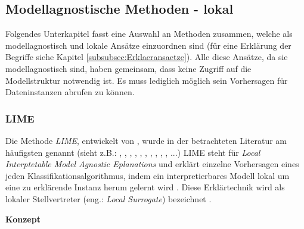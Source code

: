 \subsection{Modellagnostische Methoden - lokal}

Folgendes Unterkapitel fasst eine Auswahl an Methoden zusammen, welche als modellagnostisch und lokale Ansätze einzuordnen sind (für eine Erklärung der Begriffe siehe Kapitel \ref{subsubsec:Erklaeransaetze}). Alle diese Ansätze, da sie modellagnostisch sind, haben gemeinsam, dass keine Zugriff auf die Modellstruktur notwendig ist. Es muss lediglich möglich sein Vorhersagen für Dateninstanzen abrufen zu können.

\subsubsection{LIME}
\label{subsubse_LIME}
Die Methode \emph{LIME}, entwickelt von \textcite{ribeiro2016should}, wurde in der betrachteten Literatur am häufigsten genannt (sieht z.B.: \cite{weitz2019you}, \cite{goldenfein2019algorithmic}, \cite{tsiakmaki2021case}, \cite{tjoa2020survey}, \cite{hanif2021survey}, \cite{krause2017workflow}, \cite{gomez2021advice}, \cite{wang2020explainable}, \cite{strobel2019aspects}, \cite{westin2020building}, ...)
LIME steht für \emph{Local Interptetable Model Agnostic Eplanations} und erklärt einzelne Vorhersagen eines jeden Klassifikationsalgorithmus, indem ein interpretierbares Modell lokal um eine zu erklärende Instanz herum gelernt wird \cite{ribeiro2016should}. Diese Erklärtechnik wird als lokaler Stellvertreter (eng.: \emph{Local Surrogate}) bezeichnet \cite{molnar2022}. 

\textbf{Konzept}

